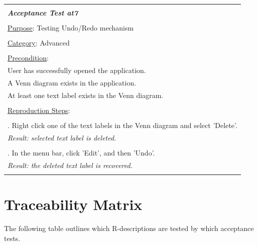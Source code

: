 \documentclass[fontsize=12pt,paper=letter,twoside]{scrartcl}
\begin{document}
\newpage

\begin{table}[!h]
	\begin{tabular}{|l|}
		\hline
		\\
		\textbf{\emph{Acceptance Test at7}} 	
		\\\\
		\underline{Purpose}: Testing Undo/Redo mechanism \\
		\\
		\underline{Category}: Advanced		\\
		\\
		\underline{Precondition}:															\\ \qquad
		User has successfully opened the application.
		\\ \qquad
		A Venn diagram exists in the application.
		\\ \qquad
		At least one text label exists in the Venn diagram.
		\\\\
		\underline{Reproduction Steps}:				
		\\\\ \qquad 1. Right click one of the text labels in the Venn diagram and select 'Delete'.
		\\ \qquad \textit{Result: selected text label is deleted.} 
		\\\\ \qquad 2. In the menu bar, click 'Edit', and then 'Undo'.
		\\ \qquad \textit{Result: the deleted text label is recovered.} 
		\\\\
		\hline
	\end{tabular}
\end{table}
\newpage
\section{Traceability Matrix}

The following table outlines which R-descriptions are tested by which acceptance tests.
\end{document}
